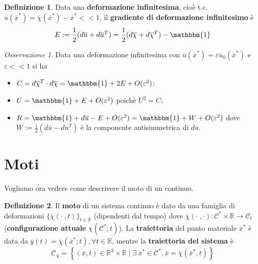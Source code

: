\documentclass{book}
\theoremstyle{plain}
\theoremstyle{plain}
\theoremstyle{plain}
\theoremstyle{plain}
\theoremstyle{plain}
\theoremstyle{definition}
\newtheorem{defi}{Definizione}[chapter]
\theoremstyle{remark}
\newtheorem*{oss}{Osservazione}
\theoremstyle{definition}
\begin{document}
\begin{defi}
    Data una \textbf{deformazione infinitesima}, cioè t.c. $\overline{u}(\overline{x}^*)=\overline{\chi}(\overline{x}^*) - \overline{x}^* <<1$, il \textbf{gradiente di deformazione infinitesimo} è
    \begin{displaymath}
        E:=\frac{1}{2}(d\overline{u}+d\overline{u}^T)=\frac12 (d\overline{\chi} + d\overline{\chi}^T)-\mathbbm{1}
    \end{displaymath}
\end{defi}

\begin{oss}
    Data una deformazione infinitesima con $\overline{u}(\overline{x}^*)=\varepsilon\overline{u}_0(\overline{x}^*)$ e $\varepsilon<<1$ si ha
    \begin{itemize}
        \item $C=d\overline{\chi}^T\cdot d\overline{\chi}=\mathbbm{1}+2E+O(\varepsilon^2)$;
        \item $U=\mathbbm{1}+E+O(\varepsilon^2)$ poichè $U^2=C$;
        \item $R=\mathbbm{1}+d\overline{u}-E+O(\varepsilon^2)=\mathbbm{1}+W+O(\varepsilon^2)$ dove $W:=\frac{1}{2} (d\overline{u}-d\overline{u}^T)$ è la componente antisimmetrica di $d\overline{u}$.
    \end{itemize}
\end{oss}

\section{Moti}

Vogliamo ora vedere come descrivere il moto di un continuo.

\begin{defi}
    Il \textbf{moto} di un sistema continuo è dato da una famiglia di deformazioni $\{\overline{\chi}(\cdot\ ,t)\}_{t\in\mathbb{R}}$ (dipendenti dal tempo)  dove $\overline{\chi}(\cdot\ ,\cdot):\mathcal{C}^*\times\mathbb{R}\to\mathcal{C}_t$ (\textbf{configurazione attuale} $\overline{\chi}(\mathcal{C}^*;t)$).
    La \textbf{traiettoria} del punto materiale $\overline{x}^*$ è data da $\overline{y}(t)= \overline{\chi}(\overline{x}^*;t), \forall t \in \mathbb{R}$, mentre la \textbf{traiettoria del sistema} è
    \begin{displaymath}
        \mathcal{C}_{\overline{\chi}}=\left\{ (\overline{x},t)\in\mathbb{R}^3\times\mathbb{R} \; |\; \exists\ \overline{x}^*\in \mathcal{C}^* , \overline{x}=\overline{\chi}(\overline{x}^*,t)\right\}
    \end{displaymath}
\end{defi}
\end{document}
